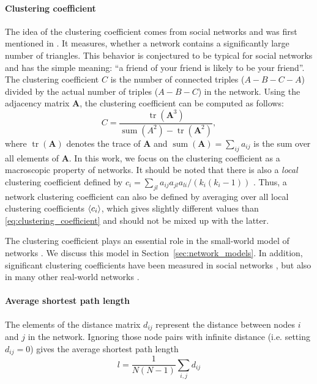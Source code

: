 \paragraph{Clustering coefficient\color{Cayenne}{.}}
The idea of the clustering coefficient comes from social networks and was first mentioned in \citep{Milgram:1967}.
It measures, whether a network contains a significantly large number of triangles.
This behavior is conjectured to be typical for social networks and has the simple meaning:
``a friend of your friend is likely to be your friend''.
The clustering coefficient $C$ is the number of connected triples ($A- B - C - A$) divided by the actual number of triples ($A- B - C $) in the network.
Using the adjacency matrix $\mathbf{A}$, the clustering coefficient can be computed as follows:
\begin{equation}\label{eq:clustering_coefficient}
C=\frac{\operatorname{tr}(\mathbf{A}^3)}{\operatorname{sum} (A^2) -\operatorname{tr}(\mathbf{A}^2)},
\end{equation}
where $\operatorname{tr}(\mathbf{A} )$ denotes the trace of $\mathbf{A}$ and $\operatorname{sum} (\mathbf{A})=\sum _{ij} a_{ij}$ is the sum over all elements of $\mathbf{A}$.
In this work, we focus on the clustering coefficient as a macroscopic property of networks.
It should be noted that there is also a \emph{local} clustering coefficient defined by $c_i=\sum _{jl} a_{ij}a_{jl}a_{li}/(k_i (k_i -1))$ \citep{Watts:1998,dynamical_processes}.
Thus, a network clustering coefficient can also be defined by averaging over all local clustering coefficients $\left< c_i \right>$, which gives slightly different values than \eqref{eq:clustering_coefficient} and should not be mixed up with the latter.

The clustering coefficient plays an essential role in the small-world model of networks \citep{Watts:1998}.
We discuss this model in Section~\ref{sec:network_models}.
In addition, significant clustering coefficients have been measured in social networks \citep{Holland1971}, but also in many other real-world networks \citep{Newman2003}.

\paragraph{Average shortest path length\color{Cayenne}{.}}
The elements of the distance matrix $d_{ij}$ represent the distance between nodes $i$ and $j$ in the network.
Ignoring those node pairs with infinite distance (i.e. setting $d_{ij}=0$) gives the average shortest path length
\begin{equation}\label{eq:}
l=\frac{1}{N(N-1)}\sum _{i, j} d_{ij}
\end{equation}

